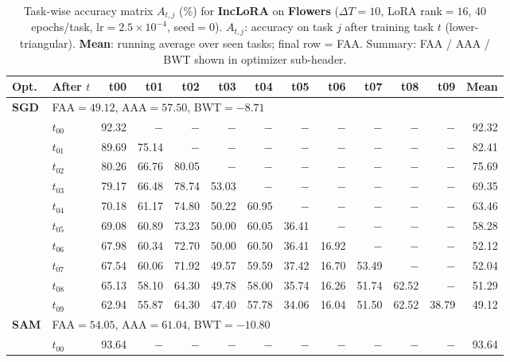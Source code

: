 \begin{table}[ht]
\centering
\caption{%
  Task-wise accuracy matrix $A_{t,j}$ (\%) for \textbf{IncLoRA} on \textbf{Flowers}
  ($\Delta T=10$, LoRA rank$=16$, 40 epochs/task, lr$=2.5\times10^{-4}$, seed$=0$).
  $A_{t,j}$: accuracy on task $j$ after training task $t$ (lower-triangular).
  \textbf{Mean}: running average over seen tasks; final row = FAA.
  Summary: FAA / AAA / BWT shown in optimizer sub-header.
}
\label{tab:raw_inclora_flowers}
\setlength{\tabcolsep}{2.8pt}
\renewcommand{\arraystretch}{0.88}
\scriptsize
\begin{tabular}{@{}l l r r r r r r r r r r r@{}}
\toprule
\textbf{Opt.} & \textbf{After $t$} & \textbf{t00} & \textbf{t01} & \textbf{t02} & \textbf{t03} & \textbf{t04} & \textbf{t05} & \textbf{t06} & \textbf{t07} & \textbf{t08} & \textbf{t09} & \textbf{Mean} \\
\midrule
\multirow{11}{*}{\textbf{SGD}} & \multicolumn{12}{l}{\quad\small FAA$=49.12$,\; AAA$=57.50$,\; BWT$=-8.71$} \\
 & $t_{00}$ & 92.32 & $-$ & $-$ & $-$ & $-$ & $-$ & $-$ & $-$ & $-$ & $-$ & 92.32 \\
 & $t_{01}$ & 89.69 & 75.14 & $-$ & $-$ & $-$ & $-$ & $-$ & $-$ & $-$ & $-$ & 82.41 \\
 & $t_{02}$ & 80.26 & 66.76 & 80.05 & $-$ & $-$ & $-$ & $-$ & $-$ & $-$ & $-$ & 75.69 \\
 & $t_{03}$ & 79.17 & 66.48 & 78.74 & 53.03 & $-$ & $-$ & $-$ & $-$ & $-$ & $-$ & 69.35 \\
 & $t_{04}$ & 70.18 & 61.17 & 74.80 & 50.22 & 60.95 & $-$ & $-$ & $-$ & $-$ & $-$ & 63.46 \\
 & $t_{05}$ & 69.08 & 60.89 & 73.23 & 50.00 & 60.05 & 36.41 & $-$ & $-$ & $-$ & $-$ & 58.28 \\
 & $t_{06}$ & 67.98 & 60.34 & 72.70 & 50.00 & 60.50 & 36.41 & 16.92 & $-$ & $-$ & $-$ & 52.12 \\
 & $t_{07}$ & 67.54 & 60.06 & 71.92 & 49.57 & 59.59 & 37.42 & 16.70 & 53.49 & $-$ & $-$ & 52.04 \\
 & $t_{08}$ & 65.13 & 58.10 & 64.30 & 49.78 & 58.00 & 35.74 & 16.26 & 51.74 & 62.52 & $-$ & 51.29 \\
 & $t_{09}$ & 62.94 & 55.87 & 64.30 & 47.40 & 57.78 & 34.06 & 16.04 & 51.50 & 62.52 & 38.79 & 49.12 \\
\midrule
\multirow{11}{*}{\textbf{SAM}} & \multicolumn{12}{l}{\quad\small FAA$=54.05$,\; AAA$=61.04$,\; BWT$=-10.80$} \\
 & $t_{00}$ & 93.64 & $-$ & $-$ & $-$ & $-$ & $-$ & $-$ & $-$ & $-$ & $-$ & 93.64 \\

\end{tabular}
\end{table}
